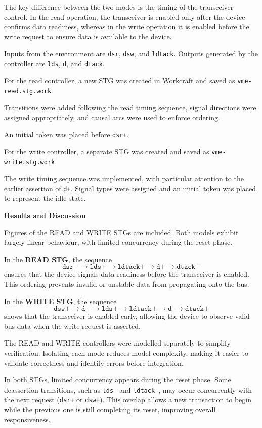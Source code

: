 \documentclass[a4paper,12pt]{article}
\begin{document}
The key difference between the two modes is the timing of the transceiver control. In the read operation, the transceiver is enabled only after the device confirms data readiness, whereas in the write operation it is enabled before the write request to ensure data is available to the device.

Inputs from the environment are \texttt{dsr}, \texttt{dsw}, and \texttt{ldtack}. Outputs generated by the controller are \texttt{lds}, \texttt{d}, and \texttt{dtack}.

For the read controller, a new STG was created in Workcraft and saved as \texttt{vme-read.stg.work}. 

Transitions were added following the read timing sequence, signal directions were assigned appropriately, and causal arcs were used to enforce ordering. 

An initial token was placed before \texttt{dsr+}.

For the write controller, a separate STG was created and saved as \texttt{vme-write.stg.work}. 

The write timing sequence was implemented, with particular attention to the earlier assertion of \texttt{d+}. Signal types were assigned and an initial token was placed to represent the idle state.

\textbf{Results and Discussion}

Figures of the READ and WRITE STGs are included. Both models exhibit largely linear behaviour, with limited concurrency during the reset phase.

In the \textbf{READ STG}, the sequence
\[
\texttt{dsr+} \rightarrow \texttt{lds+} \rightarrow \texttt{ldtack+} \rightarrow \texttt{d+} \rightarrow \texttt{dtack+}
\]
ensures that the device signals data readiness before the transceiver is enabled. This ordering prevents invalid or unstable data from propagating onto the bus.

In the \textbf{WRITE STG}, the sequence
\[
\texttt{dsw+} \rightarrow \texttt{d+} \rightarrow \texttt{lds+} \rightarrow \texttt{ldtack+} \rightarrow \texttt{d-} \rightarrow \texttt{dtack+}
\]
shows that the transceiver is enabled early, allowing the device to observe valid bus data when the write request is asserted.

The READ and WRITE controllers were modelled separately to simplify verification. Isolating each mode reduces model complexity, making it easier to validate correctness and identify errors before integration.

In both STGs, limited concurrency appears during the reset phase. Some deassertion transitions, such as \texttt{lds-} and \texttt{ldtack-}, may occur concurrently with the next request (\texttt{dsr+} or \texttt{dsw+}). This overlap allows a new transaction to begin while the previous one is still completing its reset, improving overall responsiveness.
\end{document}
